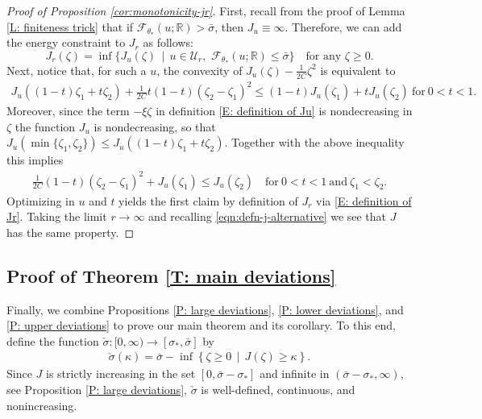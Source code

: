 \documentclass[10pt,a4paper]{amsart}
\begin{document}
		
\begin{proof}[Proof of Proposition \ref{cor:monotonicity-jr}]
	First, recall from the proof of Lemma \ref{L: finiteness trick} that if $\mathscr{F}_{\theta_{*}}(u;\mathbb{R}) > \bar{\sigma}$, then $J_{u} \equiv \infty$.  Therefore, we can add the energy constraint to $J_{r}$ as follows:
		\begin{equation*}
			J_{r}(\zeta) = \inf \{ J_{u}(\zeta) \, \mid \, u \in \mathcal{U}_{r}, \, \, \mathscr{F}_{\theta_{*}}(u;\mathbb{R}) \leq \bar{\sigma} \} \quad \text{for any} \, \, \zeta \geq 0.
		\end{equation*}
	Next, notice that, for such a $u$, the convexity of $ J_{ u } ( \zeta ) - \frac{ 1 }{ 2 C } \zeta^2 $ is equivalent to
	\begin{align*}
		J_{ u } ( ( 1 - t ) \zeta_1 + t \zeta_2 ) + \frac{ 1 }{ 2 C } t ( 1 - t ) ( \zeta_2 - \zeta_1 )^2  
		\leq (1 - t ) J_{ u } ( \zeta_1 ) + t J_{ u } ( \zeta_2 ) 
		~ \text{for} ~ 0 < t < 1 .
	\end{align*}
	Moreover, since the term $ - \xi \zeta $ in definition \eqref{E: definition of Ju} is nondecreasing in $ \zeta $ the function $ J_{ u } $ is nondecreasing, so that $ J_{ u } ( \min \{ \zeta_1, \zeta_2 \} ) \leq J_{ u } ( ( 1 - t ) \zeta_1 + t \zeta_2 ) $. Together with the above inequality this implies
	\begin{align*}
		\frac{ 1 }{ 2 C } ( 1 - t ) ( \zeta_2 - \zeta_1 )^2 + J_{ u } ( \zeta_1 ) 
		\leq J_{ u } ( \zeta_2 ) 
		\quad \text{for} ~ 0 < t < 1  ~ \text{and} ~ \zeta_1 < \zeta_2 .
	\end{align*}
	Optimizing in $ u $ and $ t $ yields the first claim by definition of $ J_{ r } $ via \eqref{E: definition of Jr}. Taking the limit $ r \rightarrow \infty $ and recalling \eqref{eqn:defn-j-alternative} we see that $ J $ has the same property. 
\end{proof}

\subsection{Proof of Theorem \ref{T: main deviations}} Finally, we combine Propositions \ref{P: large deviations}, \ref{P: lower deviations}, and \ref{P: upper deviations} to prove our main theorem and its corollary.  To this end, define the function $\check{\sigma} : [0,\infty) \to [\sigma_{*},\bar{\sigma}]$ by 
	\begin{align}\label{eqn:defn-sigma-check}
		\check{\sigma}(\kappa) = \bar{\sigma} - \inf \left\{ \zeta \geq 0 \, \mid \, J(\zeta) \geq \kappa \right\}.
	\end{align}
Since $J$ is strictly increasing in the set $ [ 0 , \bar\sigma - \sigma_{ * } ] $ and infinite in $(\bar{\sigma} - \sigma_{*},\infty)$, see Proposition \ref{P: large deviations}, $\check{\sigma}$ is well-defined, continuous, and nonincreasing.
        
\end{document}
